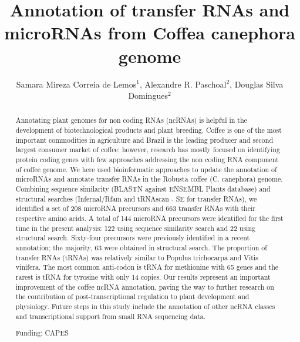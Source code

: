 \documentclass[twoside]{article}
\title{\vspace{-15mm}\fontsize{24pt}{10pt}\selectfont\textbf{Annotation of transfer RNAs and microRNAs from Coffea canephora genome}} %
\author{Samara Mireza Correia de Lemos$^1$, Alexandre R. Paschoal$^2$, Douglas Silva Domingues$^2$}
\affil{1 UNIVERSIDADE TECNOL\'OGICA FEDERAL DO PARAN\'A\\ 2 UTFPR - PPGBIOINFO\\ }
\date{}
\begin{document}
\maketitle %

\thispagestyle{fancy} %


\begin{abstract}
Annotating plant genomes for non coding RNAs (ncRNAs) is helpful in the development of biotechnological products and plant breeding. Coffee is one of the most important commodities in agriculture and Brazil is the leading producer and second largest consumer market of coffee; however, research has mostly focused on identifying protein coding genes with few approaches addressing the non coding RNA component of coffee genome.
We here used bioinformatic approaches to update the annotation of microRNAs and annotate transfer RNAs in the Robusta coffee (C. canephora) genome. 
Combining sequence similarity (BLASTN against ENSEMBL Plants database) and structural searches (Infernal/Rfam and tRNAscan - SE for transfer RNAs), we identified a set of 208 microRNA precursors and 663 transfer RNAs with their respective amino acids.
A total of 144 microRNA precursors were identified for the first time in the present analysis: 122 using sequence similarity search and 22 using structural search. Sixty-four precursors were previously identified in a recent annotation; the majority, 63 were obtained in structural search. The proportion of transfer RNAs (tRNAs) was relatively similar to Populus trichocarpa and Vitis vinifera. The most common anti-codon is tRNA for methionine with 65 genes and the rarest is tRNA for tyrosine with only 14 copies.
    Our results represent an important improvement of the coffee ncRNA annotation, paving the way to further research on the contribution of post-transcriptional regulation to plant development and physiology. Future steps in this study include the annotation of other ncRNA classes and transcriptional support from small RNA sequencing data.

Funding: CAPES
\end{abstract}
\end{document}
